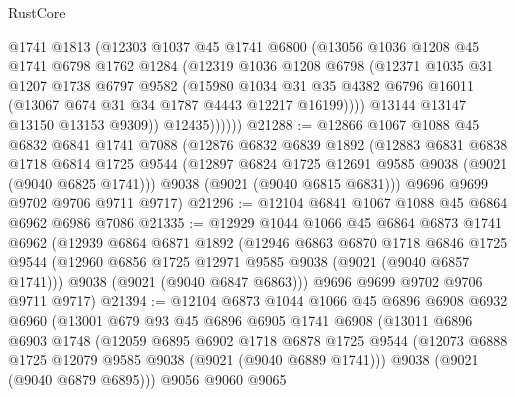 \begin{lexlean}{RustCore}
\begin{coremodule}
                @1741
                @1813
                (@12303
                  @1037
                  @45
                  @1741
                  @6800
                  (@13056
                    @1036
                    @1208
                    @45
                    @1741
                    @6798
                    @1762
                    @1284
                    (@12319
                      @1036
                      @1208
                      @6798
                      (@12371
                        @1035
                        @31
                        @1207
                        @1738
                        @6797
                        @9582
                        (@15980
                          @1034
                          @31
                          @35
                          @4382
                          @6796
                          @16011
                          (@13067 @674 @31 @34 @1787 @4443 @12217 @16199))))
                    @13144
                    @13147
                    @13150
                    @13153
                    @9309))
                @12435))))))
@21288 := @12866
    @1067
    @1088
    @45
    @6832
    @6841
    @1741
    @7088
    (@12876
      @6832
      @6839
      @1892
      (@12883
        @6831
        @6838
        @1718
        @6814
        @1725
        @9544
        (@12897 @6824 @1725 @12691 @9585 @9038 (@9021 (@9040 @6825 @1741)))
        @9038
        (@9021 (@9040 @6815 @6831)))
      @9696
      @9699
      @9702
      @9706
      @9711
      @9717)
@21296 := @12104 @6841 @1067 @1088 @45 @6864 @6962 @6986 @7086
@21335 := @12929
    @1044
    @1066
    @45
    @6864
    @6873
    @1741
    @6962
    (@12939
      @6864
      @6871
      @1892
      (@12946
        @6863
        @6870
        @1718
        @6846
        @1725
        @9544
        (@12960 @6856 @1725 @12971 @9585 @9038 (@9021 (@9040 @6857 @1741)))
        @9038
        (@9021 (@9040 @6847 @6863)))
      @9696
      @9699
      @9702
      @9706
      @9711
      @9717)
@21394 := @12104
    @6873
    @1044
    @1066
    @45
    @6896
    @6908
    @6932
    @6960
    (@13001
      @679
      @93
      @45
      @6896
      @6905
      @1741
      @6908
      (@13011
        @6896
        @6903
        @1748
        (@12059
          @6895
          @6902
          @1718
          @6878
          @1725
          @9544
          (@12073 @6888 @1725 @12079 @9585 @9038 (@9021 (@9040 @6889 @1741)))
          @9038
          (@9021 (@9040 @6879 @6895)))
        @9056
        @9060
        @9065

\end{coremodule}
\end{lexlean}
